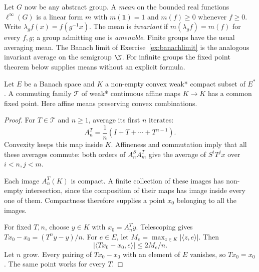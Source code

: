 Let $G$ now be any abstract group. A \emph{mean} on the bounded real functions $\ell^\infty(G)$ is a linear form $m$ with $m(\mathbf1)=1$ and $m(f)\ge0$ whenever $f\ge0$. Write $\lambda_gf(x)=f(g^{-1}x)$. The mean is \emph{invariant} if $m(\lambda_gf)=m(f)$ for every $f,g$; a group admitting one is \emph{amenable}. Finite groups have the usual averaging mean. The Banach limit of Exercise~\ref{ex:banachlimit} is the analogous invariant average on the semigroup $\N$. For infinite groups the fixed point theorem below supplies means without an explicit formula.

\begin{theorem}\label{thm:markovkakutani}
Let $E$ be a Banach space and $K$ a non-empty convex weak* compact subset of $E^*$. A commuting family $\mathcal T$ of weak* continuous affine maps $K\to K$ has a common fixed point. Here affine means preserving convex combinations.
\end{theorem}
\begin{proof}
For $T\in\mathcal T$ and $n\ge1$, average its first $n$ iterates:
\[A_n^T=\frac1n(I+T+\cdots+T^{n-1}).\]
Convexity keeps this map inside $K$. Affineness and commutation imply that all these averages commute: both orders of $A_n^SA_m^T$ give the average of $S^iT^jx$ over $i<n,j<m$.

Each image $A_n^T(K)$ is compact. A finite collection of these images has non-empty intersection, since the composition of their maps has image inside every one of them. Compactness therefore supplies a point $x_0$ belonging to all the images.

For fixed $T,n$, choose $y\in K$ with $x_0=A_n^Ty$. Telescoping gives $Tx_0-x_0=(T^ny-y)/n$. For $e\in E$, let $M_e=\max_{z\in K}|\langle z,e\rangle|$. Then
\[|\langle Tx_0-x_0,e\rangle|\le 2M_e/n.\]
Let $n$ grow. Every pairing of $Tx_0-x_0$ with an element of $E$ vanishes, so $Tx_0=x_0$. The same point works for every $T$.
\end{proof}


